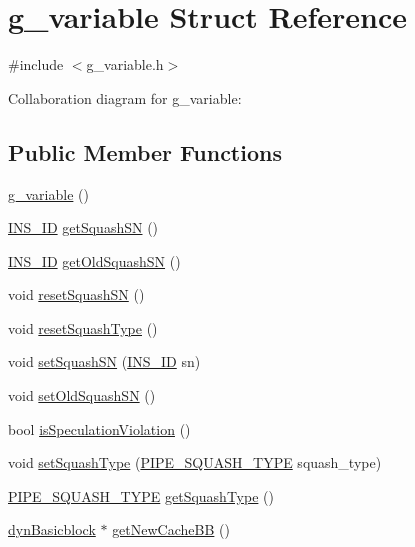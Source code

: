 \hypertarget{structg__variable}{
\section{g\_\-variable Struct Reference}
\label{structg__variable}
}


{\ttfamily \#include $<$g\_\-variable.h$>$}



Collaboration diagram for g\_\-variable:
\subsection*{Public Member Functions}
\begin{DoxyCompactItemize}
\item 
\hyperlink{structg__variable_a0b12751ab1f92b2345771c45290fc19e}{g\_\-variable} ()
\item 
\hyperlink{global_2global_8h_a1883c47d0023d0f200e1d86eced6a070}{INS\_\-ID} \hyperlink{structg__variable_a366fb213b96fa81e166dbe60a16c3e4f}{getSquashSN} ()
\item 
\hyperlink{global_2global_8h_a1883c47d0023d0f200e1d86eced6a070}{INS\_\-ID} \hyperlink{structg__variable_a7dd2d6903bbab9282b0e8c25d2c95324}{getOldSquashSN} ()
\item 
void \hyperlink{structg__variable_a0031c2dbd6463bf57b4d24335eb7b9ca}{resetSquashSN} ()
\item 
void \hyperlink{structg__variable_a506e184323be6e4c52b1394fb5aca614}{resetSquashType} ()
\item 
void \hyperlink{structg__variable_a3bbe6f8c101d665e05c30ef1eb7c9a16}{setSquashSN} (\hyperlink{global_2global_8h_a1883c47d0023d0f200e1d86eced6a070}{INS\_\-ID} sn)
\item 
void \hyperlink{structg__variable_adc6b682b4875fa3af7d390099c93dc88}{setOldSquashSN} ()
\item 
bool \hyperlink{structg__variable_a2faa8d56e7a81cb41aad7f3df5262344}{isSpeculationViolation} ()
\item 
void \hyperlink{structg__variable_abc024387ff924dbf4e9ed6b5542736c2}{setSquashType} (\hyperlink{global_2global_8h_a04ec550019a96c13610ad1f3269182af}{PIPE\_\-SQUASH\_\-TYPE} squash\_\-type)
\item 
\hyperlink{global_2global_8h_a04ec550019a96c13610ad1f3269182af}{PIPE\_\-SQUASH\_\-TYPE} \hyperlink{structg__variable_a29591157526fb0dbc3b2f4d7d3d9b2b0}{getSquashType} ()
\item 
\hyperlink{classdynBasicblock}{dynBasicblock} $\ast$ \hyperlink{structg__variable_abd791f9496e5723f7347c56c01c661e3}{getNewCacheBB} ()

\end{DoxyCompactItemize}
